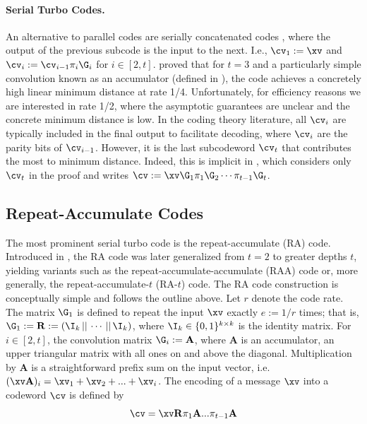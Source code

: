 \paragraph{Serial Turbo Codes.} An alternative to parallel codes are serially concatenated codes \cite{kahale1998minimum,benedetto1998serial}, where the output of the previous subcode is the input to the next. I.e.,  $\cv_1:=\xv$ and 
$
    \cv_i := \cv_{i-1} \pi_i \G_i
$
for $i\in [2,t]$. 
\cite{kahale1998minimum,spielman} proved that for $t = 3$ and a particularly simple convolution known as an accumulator (defined in ), the code achieves a concretely high linear minimum distance at rate 1/4. Unfortunately, for efficiency reasons we are interested in rate 1/2, where the asymptotic guarantees are unclear and the concrete minimum distance is low.
In the coding theory literature, all $\cv_i$ are typically included in the final output to facilitate decoding, where $\cv_i$ are the parity bits of $\cv_{i-1}$. However, it is the last subcodeword $\cv_t$ that contributes the most to minimum distance. Indeed, this is implicit in \cite{spielman}, which considers only $\cv_t$ in the proof and writes $\cv := \xv \G_1 \pi_1 \G_2 \cdots \pi_{t-1} \G_t$.


\subsection{Repeat-Accumulate Codes}\label{sec:RA}

The most prominent serial turbo code is the repeat-accumulate (RA) code. Introduced in \cite{ra,kahale1998minimum}, the RA code was later generalized from $t=2$ to greater depths $t$, yielding variants such as the repeat-accumulate-accumulate (RAA) code or, more generally, the repeat-accumulate-$t$ (RA-$t$) code.
The RA code construction is conceptually simple and follows the outline above. 
Let $r$ denote the code rate. The matrix $\G_1$ is defined to repeat the input $\xv$ exactly $e := 1/r$ times; that is, $\G_1 := \mathbf{R} := (\I_k \, || \, \cdots \, || \, \I_k)$, where $\I_k \in \{0,1\}^{k \times k}$ is the identity matrix. For $i \in [2, t]$, the convolution matrix $\G_i := \mathbf{A}$, where $\mathbf{A}$ is an accumulator, an upper triangular matrix with all ones on and above the diagonal.
Multiplication by $\mathbf{A}$ is a straightforward prefix sum on the input vector, i.e. $(\xv \mathbf{A})_i = \xv_1+\xv_2 + ... +\xv_i$.
The encoding of a message $\xv$ into a codeword $\cv$ is defined by
\[
\cv =\xv \mathbf{R} \pi_1 \mathbf{A} ... \pi_{t-1} \mathbf{A}
\]


